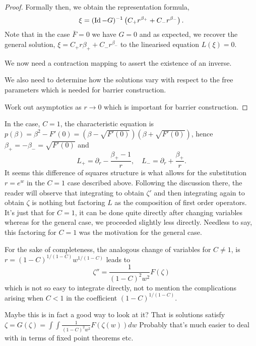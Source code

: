 \documentclass{amsart}
\begin{document}
\begin{proof}
Formally then, we obtain the representation formula,
\begin{equation}
\label{eq:stationaryC_formal}
\xi = (\operatorname{Id} - G)^{-1} \left(C_+ r^{\beta_+} + C_- r^{\beta_-}\right).
\end{equation}
Note that in the case \(\bar{F} = 0\) we have \(G = 0\) and as expected, we recover the general solution, \(\xi = C_+ r{\beta_+} + C_- r^{\beta_-}\) to the linearised equation \(L(\xi) = 0\).

{\color{red} We now need a contraction mapping to assert the existence of an inverse}.

{\color{red}We also need to determine how the solutions vary with respect to the free parameters which is needed for barrier construction}.

{\color{red}Work out asymptotics as \(r\to 0\) which is important for barrier construction}.
\end{proof}

\begin{rem}
In the case, \(C = 1\), the characteristic equation is \(p(\beta) = \beta^2 - F'(0) = (\beta - \sqrt{F'(0)})(\beta + \sqrt{F'(0)})\), hence \(\beta_+ = -\beta_- = \sqrt{F'(0)}\) and
\[
L_+ = \partial_r - \frac{\beta_+ - 1}{r}, \quad L_- = \partial_r + \frac{\beta_+}{r}.
\]
It seems this difference of squares structure is what allows for the substitution \(r = e^w\) in the \(C=1\) case described above. Following the discussion there, the reader will observe that integrating to obtain \(\zeta'\) and then integrating again to obtain \(\zeta\) is nothing but factoring \(L\) as the composition of first order operators. It's just that for \(C = 1\), it can be done quite directly after changing variables whereas for the general case, we proceeded slightly less directly. Needless to say, this factoring for \(C = 1\) was the motivation for the general case.

For the sake of completeness, the analogous change of variables for \(C \ne 1\), is \(r = (1-C)^{1/(1-C)} w^{1/(1-C)}\) leads to
\begin{equation}
\label{eq:stationaryC_change_var}
\zeta'' = \frac{1}{(1-C)^2 w^2} F(\zeta)
\end{equation}
which is not so easy to integrate directly, not to mention the complications arising when \(C < 1\) in the coefficient \((1 - C)^{1/(1 - C)}\).
\end{rem}

{\color{red} Maybe this is in fact a good way to look at it? That is solutions satisfy \(\zeta = G(\zeta) = \int \int \frac{1}{(1-C)^2 w^2} F(\zeta(w)) dw\) Probably that's much easier to deal with in terms of fixed point theorems etc.}
\end{document}
